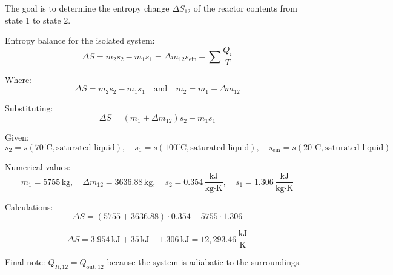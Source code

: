 The goal is to determine the entropy change \( \Delta S_{12} \) of the reactor contents from state 1 to state 2.  

Entropy balance for the isolated system:  
\[
\Delta S = m_2 s_2 - m_1 s_1 = \Delta m_{12} s_{\text{ein}} + \sum \frac{Q_i}{T}
\]  

Where:  
\[
\Delta S = m_2 s_2 - m_1 s_1 \quad \text{and} \quad m_2 = m_1 + \Delta m_{12}
\]  

Substituting:  
\[
\Delta S = (m_1 + \Delta m_{12}) s_2 - m_1 s_1
\]  

Given:  
\[
s_2 = s(70^\circ\text{C}, \text{saturated liquid}), \quad s_1 = s(100^\circ\text{C}, \text{saturated liquid}), \quad s_{\text{ein}} = s(20^\circ\text{C}, \text{saturated liquid})
\]  

Numerical values:  
\[
m_1 = 5755 \, \text{kg}, \quad \Delta m_{12} = 3636.88 \, \text{kg}, \quad s_2 = 0.354 \, \frac{\text{kJ}}{\text{kg·K}}, \quad s_1 = 1.306 \, \frac{\text{kJ}}{\text{kg·K}}
\]  

Calculations:  
\[
\Delta S = (5755 + 3636.88) \cdot 0.354 - 5755 \cdot 1.306
\]  

\[
\Delta S = 3.954 \, \text{kJ} + 35 \, \text{kJ} - 1.306 \, \text{kJ} = 12,293.46 \, \frac{\text{kJ}}{\text{K}}
\]  

Final note: \( Q_{R,12} = Q_{\text{out},12} \) because the system is adiabatic to the surroundings.